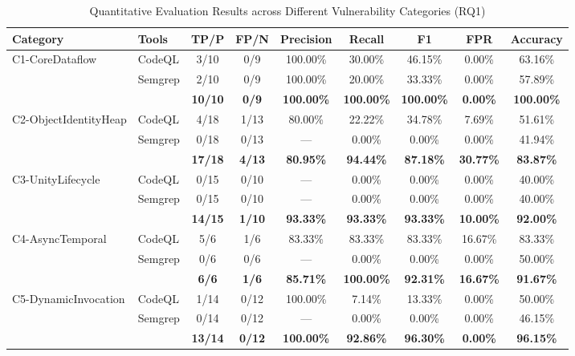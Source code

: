 \begin{table}[t]
\centering
\caption{Quantitative Evaluation Results across Different Vulnerability Categories (RQ1)}
\label{tab:rq1_results}
\small
\setlength{\tabcolsep}{5pt}
\begin{tabular}{l|l|c|c|c|c|c|c|c}
\hline
Category & Tools & TP/P & FP/N & Precision & Recall & F1 & FPR & Accuracy \\ \hline
\multirow{3}{*}{C1-CoreDataflow} & CodeQL & 3/10 & 0/9 & 100.00\% & 30.00\% & 46.15\% & 0.00\% & 63.16\% \\
 & Semgrep & 2/10 & 0/9 & 100.00\% & 20.00\% & 33.33\% & 0.00\% & 57.89\% \\
 & \sys{} & \textbf{10/10} & \textbf{0/9} & \textbf{100.00\%} & \textbf{100.00\%} & \textbf{100.00\%} & \textbf{0.00\%} & \textbf{100.00\%} \\
\hline
\multirow{3}{*}{C2-ObjectIdentityHeap} & CodeQL & 4/18 & 1/13 & 80.00\% & 22.22\% & 34.78\% & 7.69\% & 51.61\% \\
 & Semgrep & 0/18 & 0/13 & --- & 0.00\% & 0.00\% & 0.00\% & 41.94\% \\
 & \sys{} & \textbf{17/18} & \textbf{4/13} & \textbf{80.95\%} & \textbf{94.44\%} & \textbf{87.18\%} & \textbf{30.77\%} & \textbf{83.87\%} \\
\hline
\multirow{3}{*}{C3-UnityLifecycle} & CodeQL & 0/15 & 0/10 & --- & 0.00\% & 0.00\% & 0.00\% & 40.00\% \\
 & Semgrep & 0/15 & 0/10 & --- & 0.00\% & 0.00\% & 0.00\% & 40.00\% \\
 & \sys{} & \textbf{14/15} & \textbf{1/10} & \textbf{93.33\%} & \textbf{93.33\%} & \textbf{93.33\%} & \textbf{10.00\%} & \textbf{92.00\%} \\
\hline
\multirow{3}{*}{C4-AsyncTemporal} & CodeQL & 5/6 & 1/6 & 83.33\% & 83.33\% & 83.33\% & 16.67\% & 83.33\% \\
 & Semgrep & 0/6 & 0/6 & --- & 0.00\% & 0.00\% & 0.00\% & 50.00\% \\
 & \sys{} & \textbf{6/6} & \textbf{1/6} & \textbf{85.71\%} & \textbf{100.00\%} & \textbf{92.31\%} & \textbf{16.67\%} & \textbf{91.67\%} \\
\hline
\multirow{3}{*}{C5-DynamicInvocation} & CodeQL & 1/14 & 0/12 & 100.00\% & 7.14\% & 13.33\% & 0.00\% & 50.00\% \\
 & Semgrep & 0/14 & 0/12 & --- & 0.00\% & 0.00\% & 0.00\% & 46.15\% \\
 & \sys{} & \textbf{13/14} & \textbf{0/12} & \textbf{100.00\%} & \textbf{92.86\%} & \textbf{96.30\%} & \textbf{0.00\%} & \textbf{96.15\%} \\

\end{tabular}
\end{table}
